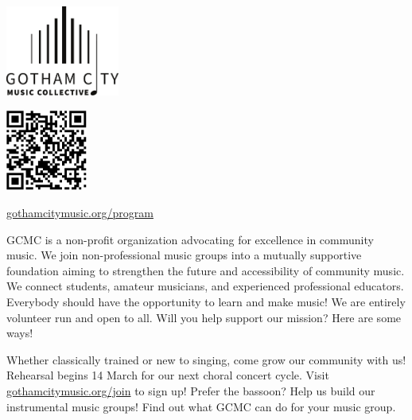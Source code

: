 \documentclass{article}[10pt]
\newcommand{\logo}{
        {\includegraphics[width=0.28\textwidth]{../graphic_design_assets/bw_logo_full}}
}
\newcommand{\tunedspace}{\vspace{0.15in}}
\begin{document}
    \begin{center}
    {\logo}

        \tunedspace

        \begin{minipage}{4in}

            \begin{center}
            {\textbf{}}

                \vspace{0.1in}

                {\includegraphics[width=0.2\textwidth]{../graphic_design_assets/gotham_city_music_collective_program.png}}

                \href{https://gothamcitymusic.org/program}{gothamcitymusic.org/program}
            \end{center}

            \begin{small}
                GCMC is a non-profit organization advocating for excellence in community music.
                We join non-professional music groups into a mutually supportive foundation aiming
                to strengthen the future and accessibility of community music.
                We connect students, amateur musicians, and experienced professional educators.
                Everybody should have the opportunity to learn and make music!
                We are entirely volunteer run and open to all.
                Will you help support our mission?
                Here are some ways!
            \end{small}

            \begin{center}
            {\textbf{}}
            \end{center}

            \vspace{-0.1in}

            \begin{small}
                Whether classically trained or new to singing, come grow our community with us!
                Rehearsal begins 14 March for our next choral concert cycle.
                Visit {\href{gothamcitymusic.org/join}{gothamcitymusic.org/join}} to sign up!
                Prefer the bassoon?
                Help us build our instrumental music groups!
                Find out what GCMC can do for your music group.
            \end{small}


\end{minipage}
\end{center}
\end{document}
